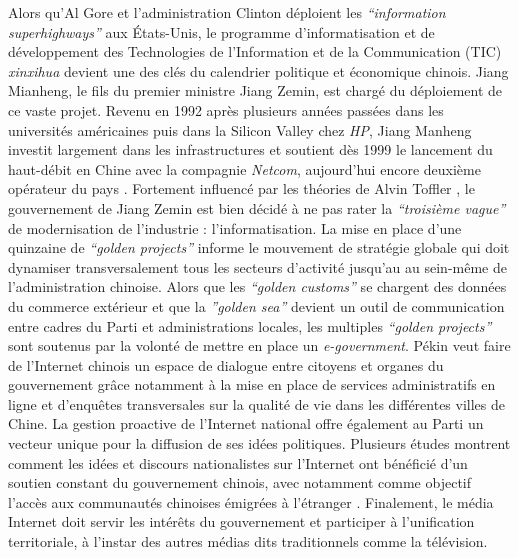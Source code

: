 Alors qu’Al Gore et l’administration Clinton déploient les \textit{“information superhighways”} aux États-Unis, le programme d’informatisation et de développement des Technologies de l'Information et de la Communication (TIC) \textit{xinxihua}  devient une des clés du calendrier politique et économique chinois. Jiang Mianheng, le fils du premier ministre Jiang Zemin, est chargé du déploiement de ce vaste projet. Revenu en 1992 après plusieurs années passées dans les universités américaines puis dans la Silicon Valley chez \textit{HP}, Jiang Manheng investit largement dans les infrastructures et soutient dès 1999 le lancement du haut-débit en Chine avec la compagnie \textit{Netcom}, aujourd’hui encore deuxième opérateur du pays \citep{Dai2007}. Fortement influencé par les théories de Alvin Toffler \citep{Tsui2007}, le gouvernement de Jiang Zemin est bien décidé à ne pas rater la \textit{“troisième vague”} de modernisation de l’industrie : l’informatisation. La mise en place d’une quinzaine de \textit{“golden projects”} informe le mouvement de stratégie globale qui doit dynamiser transversalement tous les secteurs d’activité jusqu’au au sein-même de l’administration chinoise. Alors que les \textit{“golden customs”} se chargent des données du commerce extérieur et que la \textit{”golden sea”} devient un outil de communication entre cadres du Parti et administrations locales, les multiples \textit{“golden projects”} sont soutenus par la volonté de mettre en place un \textit{e-government}. Pékin veut faire de l’Internet chinois un espace de dialogue entre citoyens et organes du gouvernement grâce notamment à la mise en place de services administratifs en ligne et d’enquêtes transversales sur la qualité de vie dans les différentes villes de Chine. La gestion proactive de l’Internet national offre également au Parti un vecteur unique pour la diffusion de ses idées politiques. Plusieurs études montrent comment les idées et discours nationalistes sur l’Internet ont bénéficié d’un soutien constant du gouvernement chinois, avec notamment comme objectif l’accès aux communautés chinoises émigrées à l’étranger \citep{Hughes2000}. Finalement, le média Internet doit servir les intérêts du gouvernement et participer à l’unification territoriale, à l’instar des autres médias dits traditionnels comme la télévision.

